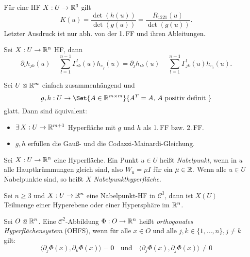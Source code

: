 \documentclass{cheat-sheet}
\begin{document}
\begin{satz}
  Für eine HF $X : U \to \mathbb{R}^3$ gilt
  \[ K(u) = \frac{\det(h(u))}{\det(g(u))} = \frac{R_{1221}(u)}{\det(g(u))}. \]
  Letzter Ausdruck ist nur abh. von der 1.\,FF und ihren Ableitungen.
\end{satz}

\begin{satz}
  Sei $X : U \to \mathbb{R}^n$ HF, dann
  \[ \partial_i h_{jk}(u) - \sum_{l=1}^{n-1} \Gamma_{ik}^l(u) h_{e_j}(u) = \partial_j h_{ik}(u) - \sum_{l=1}^{n-1} \Gamma_{jk}^l(u) h_{e_i}(u). \]
\end{satz}

\begin{satz}
  Sei $U \opn \R^m$ einfach zusammenhängend und
  \[ g, h : U \to \Set{ A \in \R^{m \times m} }{ A^T = A, \, A \text{ positiv definit } } \]
  glatt. Dann sind äquivalent:
  \begin{itemize}
    \item $\exists \, X : U \to \mathbb{R}^{m+1}$ Hyperfläche mit $g$ und $h$ als 1.\,FF bzw. 2.\,FF.
    \item $g, h$ erfüllen die Gauß- und die Codazzi-Mainardi-Gleichung.
  \end{itemize}
\end{satz}



\begin{defn}
  Sei $X : U \to \mathbb{R}^n$ eine Hyperfläche. Ein Punkt $u \in U$ heißt \emph{Nabelpunkt}, wenn in $u$ alle Hauptkrümmungen gleich sind, also $W_u = \mu I$ für ein $\mu \in \mathbb{R}$. Wenn alle $u \in U$ Nabelpunkte sind, so heißt $X$ \emph{Nabelpunkthyperfläche}.
\end{defn}

\begin{satz}
  Sei $n \geq 3$ und $X : U \to \mathbb{R}^n$ eine Nabelpunkt-HF in $\mathcal{C}^3$, dann ist $X(U)$ Teilmenge einer Hyperebene oder einer Hypersphäre im $\mathbb{R}^n$.
\end{satz}

\begin{defn}
  Sei $O \opn \R^n$. Eine $\mathcal{C}^2$-Abbildung $\Phi : O \to \mathbb{R}^n$ heißt \emph{orthogonales Hyperflächensystem} (OHFS), wenn für alle $x \in O$ und alle $j, k \in \{ 1, ..., n \}, j \not= k$ gilt:
  \[
    \langle \partial_j \Phi(x), \partial_k \Phi(x) \rangle = 0
    \quad \text{und} \quad
    \langle \partial_j \Phi(x), \partial_j \Phi(x) \rangle \not= 0
  \]
\end{defn}
\end{document}
